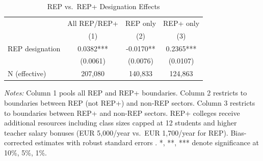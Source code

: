 \begin{table}[htbp]
\centering
\caption{REP vs.\ REP+ Designation Effects}
\label{tab:rep_vs_repp}
\begin{tabular}{lccc}
\toprule
 & All REP/REP+ & REP only & REP+ only \\
 & (1) & (2) & (3) \\
\midrule
REP designation & 0.0382*** & -0.0170** & 0.2365*** \\
 & (0.0061) & (0.0076) & (0.0107) \\
\midrule
N (effective) & 207,080 & 140,833 & 124,863 \\
\bottomrule
\end{tabular}
\begin{tablenotes}
\small
\item \textit{Notes:} Column 1 pools all REP and REP+ boundaries. Column 2 restricts to boundaries between REP (not REP+) and non-REP sectors. Column 3 restricts to boundaries between REP+ and non-REP sectors. REP+ colleges receive additional resources including class sizes capped at 12 students and higher teacher salary bonuses (EUR 5,000/year vs.\ EUR 1,700/year for REP). Bias-corrected estimates with robust standard errors \citep{cattaneo2020}. *, **, *** denote significance at 10\%, 5\%, 1\%.
\end{tablenotes}
\end{table}
